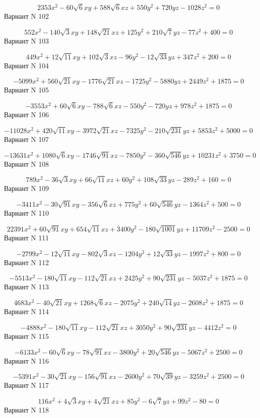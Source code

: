 \documentclass[11pt]{report}
\begin{document}
$$2353 x^{2} - 60 \sqrt{6} x y + 588 \sqrt{6} x z + 550 y^{2} + 720 y z - 1028 z^{2} = 0$$Вариант N 102

$$552 x^{2} - 140 \sqrt{3} x y + 148 \sqrt{21} x z + 125 y^{2} + 210 \sqrt{7} y z - 77 z^{2} + 400 = 0$$Вариант N 103

$$449 x^{2} + 12 \sqrt{11} x y + 102 \sqrt{3} x z - 96 y^{2} - 12 \sqrt{33} y z + 347 z^{2} + 200 = 0$$Вариант N 104

$$- 5099 x^{2} + 560 \sqrt{21} x y - 1776 \sqrt{21} x z - 1725 y^{2} - 5880 y z + 2449 z^{2} + 1875 = 0$$Вариант N 105

$$- 3553 x^{2} + 60 \sqrt{6} x y - 788 \sqrt{6} x z - 550 y^{2} - 720 y z + 978 z^{2} + 1875 = 0$$Вариант N 106

$$- 11028 x^{2} + 420 \sqrt{11} x y - 3972 \sqrt{21} x z - 7325 y^{2} - 210 \sqrt{231} y z + 5853 z^{2} + 5000 = 0$$Вариант N 107

$$- 13631 x^{2} + 1080 \sqrt{6} x y - 1746 \sqrt{91} x z - 7850 y^{2} - 360 \sqrt{546} y z + 10231 z^{2} + 3750 = 0$$Вариант N 108

$$789 x^{2} - 36 \sqrt{3} x y + 66 \sqrt{11} x z + 60 y^{2} + 108 \sqrt{33} y z - 289 z^{2} + 160 = 0$$Вариант N 109

$$- 3411 x^{2} - 30 \sqrt{91} x y - 356 \sqrt{6} x z + 775 y^{2} + 60 \sqrt{546} y z - 1364 z^{2} + 500 = 0$$Вариант N 110

$$22391 x^{2} + 60 \sqrt{91} x y + 654 \sqrt{11} x z + 3400 y^{2} - 180 \sqrt{1001} y z + 11709 z^{2} - 2500 = 0$$Вариант N 111

$$- 2799 x^{2} - 12 \sqrt{11} x y - 802 \sqrt{3} x z - 1204 y^{2} + 12 \sqrt{33} y z - 1997 z^{2} + 800 = 0$$Вариант N 112

$$- 5513 x^{2} - 180 \sqrt{11} x y - 112 \sqrt{21} x z + 2425 y^{2} + 90 \sqrt{231} y z - 5037 z^{2} + 1875 = 0$$Вариант N 113

$$4683 x^{2} - 40 \sqrt{21} x y + 1268 \sqrt{6} x z - 2075 y^{2} + 240 \sqrt{14} y z - 2608 z^{2} + 1875 = 0$$Вариант N 114

$$- 4888 x^{2} - 180 \sqrt{11} x y - 112 \sqrt{21} x z + 3050 y^{2} + 90 \sqrt{231} y z - 4412 z^{2} = 0$$Вариант N 115

$$- 6133 x^{2} - 60 \sqrt{6} x y - 78 \sqrt{91} x z - 3800 y^{2} + 20 \sqrt{546} y z - 5067 z^{2} + 2500 = 0$$Вариант N 116

$$- 5391 x^{2} - 30 \sqrt{21} x y - 156 \sqrt{91} x z - 2600 y^{2} + 70 \sqrt{39} y z - 3259 z^{2} + 2500 = 0$$Вариант N 117

$$116 x^{2} + 4 \sqrt{3} x y + 4 \sqrt{21} x z + 85 y^{2} - 6 \sqrt{7} y z + 99 z^{2} - 80 = 0$$Вариант N 118
\end{document}
